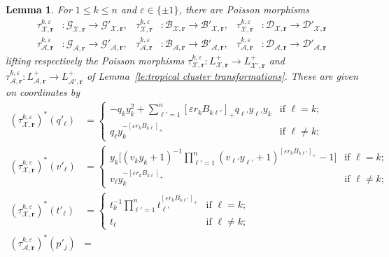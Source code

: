 \documentclass{amsart}
\newtheorem{lemma}[theorem]{Lemma}
\numberwithin{equation}{section}
\newcommand{\bfr}{{\boldsymbol{r}}}
\newcommand{\cA}{\mathcal{A}}
\newcommand{\cB}{\mathcal{B}}
\newcommand{\cD}{\mathcal{D}}
\newcommand{\cG}{\mathcal{G}}
\newcommand{\cX}{\mathcal{X}}
\begin{document}
\begin{lemma}
  \label{le:tropical groupoid transformations}
  For $1\le k\le n$ and $\varepsilon\in\{\pm1\}$, there are Poisson morphisms 
  \begin{align*}
    \tau_{\cX,\bfr}^{k,\varepsilon}&:\cG_{\cX,\bfr}\to\cG'_{\cX,\bfr},& \tau_{\cX,\bfr}^{k,\varepsilon}&:\cB_{\cX,\bfr}\to\cB'_{\cX,\bfr},& \tau_{\cX,\bfr}^{k,\varepsilon}&:\cD_{\cX,\bfr}\to\cD'_{\cX,\bfr}\\
    \tau_{\cA,\bfr}^{k,\varepsilon}&:\cG_{\cA,\bfr}\to\cG'_{\cA,\bfr},& \tau_{\cA,\bfr}^{k,\varepsilon}&:\cB_{\cA,\bfr}\to\cB'_{\cA,\bfr},& \tau_{\cA,\bfr}^{k,\varepsilon}&:\cD_{\cA,\bfr}\to\cD'_{\cA,\bfr}
  \end{align*}
  lifting respectively the Poisson morphisms $\tau_{\cX,\bfr}^{k,\varepsilon}:L^+_{\cX,\bfr}\to L^+_{\cX',\bfr}$ and $\tau_{\cA,\bfr}^{k,\varepsilon}:L^+_{\cA,\bfr}\to L^+_{\cA',\bfr}$ of Lemma~\ref{le:tropical cluster transformations}.
  These are given on coordinates by
  \begin{align}
    \label{eq:tropical GX transformation}
    (\tau_{\cX,\bfr}^{k,\varepsilon})^*(q'_\ell)
    &=\begin{cases} 
      -q_k y_k^2 + \sum\limits_{\ell'=1}^n [\varepsilon r_k B_{k\ell'}]_+ q_{\ell'} y_{\ell'} y_k & \text{if $\ell=k$;}\\ 
      q_\ell y_k^{-[\varepsilon r_k B_{k\ell}]_+} & \text{if $\ell\ne k$;}
    \end{cases}\\
    \label{eq:tropical BX transformation}
    (\tau_{\cX,\bfr}^{k,\varepsilon})^*(v'_\ell)
    &=\begin{cases} 
      y_k\Big[(v_k y_k + 1)^{-1}\prod\limits_{\ell'=1}^n (v_{\ell'} y_{\ell'} + 1)^{[\varepsilon r_k B_{k\ell'}]_+} -1\Big] & \text{if $\ell=k$;}\\
      v_\ell y_k^{-[\varepsilon r_k B_{k\ell}]_+} & \text{if $\ell\ne k$;}
    \end{cases}\\
    \label{eq:tropical DX transformation}
    (\tau_{\cX,\bfr}^{k,\varepsilon})^*(t'_\ell)
    &=\begin{cases} 
      t_k^{-1}\prod\limits_{\ell'=1}^n t_{\ell'}^{[\varepsilon r_k B_{k\ell'}]_+} & \text{if $\ell=k$;}\\
      t_\ell & \text{if $\ell\ne k$;}
    \end{cases}\\
    \label{eq:tropical GA transformation}
    (\tau_{\cA,\bfr}^{k,\varepsilon})^*(p'_j)&=

\end{align}
\end{lemma}
\end{document}
